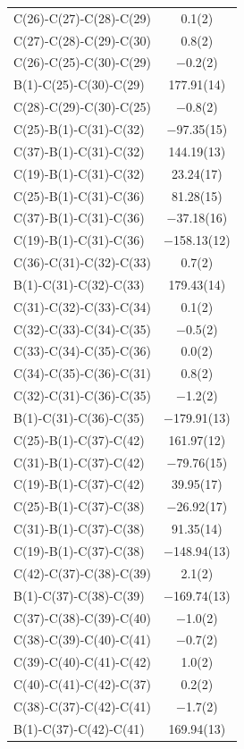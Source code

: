 \begin{center}
{\begin{supertabular}{p{1.5in}c}
C(26)-C(27)-C(28)-C(29)&0.1(2)\\
C(27)-C(28)-C(29)-C(30)&0.8(2)\\
C(26)-C(25)-C(30)-C(29)&$-$0.2(2)\\
B(1)-C(25)-C(30)-C(29)&177.91(14)\\
C(28)-C(29)-C(30)-C(25)&$-$0.8(2)\\
C(25)-B(1)-C(31)-C(32)&$-$97.35(15)\\
C(37)-B(1)-C(31)-C(32)&144.19(13)\\
C(19)-B(1)-C(31)-C(32)&23.24(17)\\
C(25)-B(1)-C(31)-C(36)&81.28(15)\\
C(37)-B(1)-C(31)-C(36)&$-$37.18(16)\\
C(19)-B(1)-C(31)-C(36)&$-$158.13(12)\\
C(36)-C(31)-C(32)-C(33)&0.7(2)\\
B(1)-C(31)-C(32)-C(33)&179.43(14)\\
C(31)-C(32)-C(33)-C(34)&0.1(2)\\
C(32)-C(33)-C(34)-C(35)&$-$0.5(2)\\
C(33)-C(34)-C(35)-C(36)&0.0(2)\\
C(34)-C(35)-C(36)-C(31)&0.8(2)\\
C(32)-C(31)-C(36)-C(35)&$-$1.2(2)\\
B(1)-C(31)-C(36)-C(35)&$-$179.91(13)\\
C(25)-B(1)-C(37)-C(42)&161.97(12)\\
C(31)-B(1)-C(37)-C(42)&$-$79.76(15)\\
C(19)-B(1)-C(37)-C(42)&39.95(17)\\
C(25)-B(1)-C(37)-C(38)&$-$26.92(17)\\
C(31)-B(1)-C(37)-C(38)&91.35(14)\\
C(19)-B(1)-C(37)-C(38)&$-$148.94(13)\\
C(42)-C(37)-C(38)-C(39)&2.1(2)\\
B(1)-C(37)-C(38)-C(39)&$-$169.74(13)\\
C(37)-C(38)-C(39)-C(40)&$-$1.0(2)\\
C(38)-C(39)-C(40)-C(41)&$-$0.7(2)\\
C(39)-C(40)-C(41)-C(42)&1.0(2)\\
C(40)-C(41)-C(42)-C(37)&0.2(2)\\
C(38)-C(37)-C(42)-C(41)&$-$1.7(2)\\
B(1)-C(37)-C(42)-C(41)&169.94(13)\\
\end{supertabular}
}
\end{center}

